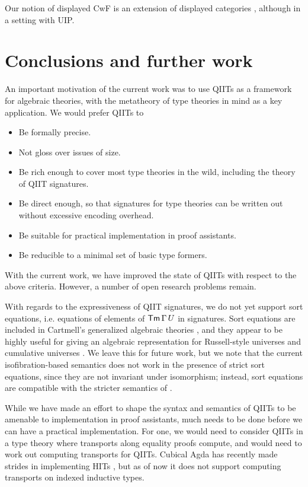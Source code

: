 \documentclass[sigplan,review,anonymous]{acmart}\settopmatter{printfolios=true,printccs=false,printacmref=false}
\begin{document}
Our notion of displayed CwF is an extension of displayed categories
\cite{displayedcats}, although in a setting with UIP.

\section{Conclusions and further work}
\label{sec:conclusion}

An important motivation of the current work was to use QIITs as a framework for
algebraic theories, with the metatheory of type theories in mind as a key
application. We would prefer QIITs to
\begin{itemize}
\item Be formally precise.
\item Not gloss over issues of size.
\item Be rich enough to cover most type theories in the wild, including the theory
      of QIIT signatures.
\item Be direct enough, so that signatures for type theories can
      be written out without excessive encoding overhead.
\item Be suitable for practical implementation in proof assistants.
\item Be reducible to a minimal set of basic type formers.
\end{itemize}

With the current work, we have improved the state of QIITs with respect to
the above criteria. However, a number of open research problems remain.

With regards to the expressiveness of QIIT signatures, we do not yet
support sort equations, i.e. equations of elements of $\mathsf{Tm}\,\Gamma\,U$ in
signatures. Sort equations are included in Cartmell's generalized algebraic
theories \cite{gat}, and they appear to be highly useful for giving an algebraic
representation for Russell-style universes and cumulative universes
\cite{sterling2019algebraic}. We leave this for future work, but we note that
the current isofibration-based semantics does not work in the presence of strict
sort equations, since they are not invariant under isomorphism; instead, sort
equations are compatible with the stricter semantics of
\cite{kaposi2019constructing}.

While we have made an effort to shape the syntax and semantics of QIITs to
be amenable to implementation in proof assistants, much needs to be done before
we can have a practical implementation. For one, we would need to consider QIITs
in a type theory where transports along equality proofs compute, and would need
to work out computing transports for QIITs. Cubical Agda has recently made
strides in implementing HITs \cite{vezzosicubical}, but as of now it does not
support computing transports on indexed inductive types.
\end{document}
